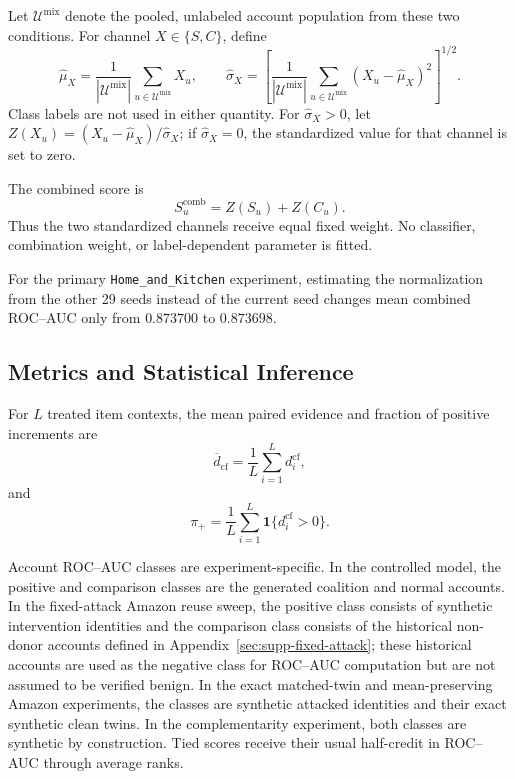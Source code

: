 Let $\mathcal U^{\mathrm{mix}}$ denote the pooled, unlabeled account population
from these two conditions. For channel $X\in\{S,C\}$, define
\[
\widehat\mu_X
=
\frac{1}{|\mathcal U^{\mathrm{mix}}|}
\sum_{u\in\mathcal U^{\mathrm{mix}}}X_u,
\qquad
\widehat\sigma_X
=
\left[
\frac{1}{|\mathcal U^{\mathrm{mix}}|}
\sum_{u\in\mathcal U^{\mathrm{mix}}}
(X_u-\widehat\mu_X)^2
\right]^{1/2}.
\]
Class labels are not used in either quantity. For $\widehat\sigma_X>0$, let
$Z(X_u)=(X_u-\widehat\mu_X)/\widehat\sigma_X$; if
$\widehat\sigma_X=0$, the standardized value for that channel is set to zero.

The combined score is
\begin{equation}
\label{eq:supp-combined-score}
S_u^{\mathrm{comb}}
=
Z(S_u)+Z(C_u).
\end{equation}
Thus the two standardized channels receive equal fixed weight. No classifier,
combination weight, or label-dependent parameter is fitted.

For the primary \texttt{Home\_and\_Kitchen} experiment, estimating the
normalization from the other 29 seeds instead of the current seed changes
mean combined ROC--AUC only from $0.873700$ to $0.873698$.



\subsection{Metrics and Statistical Inference}
\label{sec:supp-metrics}

For $L$ treated item contexts, the mean paired evidence and fraction of
positive increments are
\begin{equation}
\label{eq:supp-mean-dcf}
\overline d_{\mathrm{cf}}
=
\frac{1}{L}
\sum_{i=1}^{L}d_i^{\mathrm{cf}},
\end{equation}
and
\begin{equation}
\label{eq:supp-positive-dcf}
\pi_+
=
\frac{1}{L}
\sum_{i=1}^{L}
\mathbf 1\{d_i^{\mathrm{cf}}>0\}.
\end{equation}

Account ROC--AUC classes are experiment-specific. In the controlled model,
the positive and comparison classes are the generated coalition and normal
accounts. In the fixed-attack Amazon reuse sweep, the positive class consists
of synthetic intervention identities and the comparison class consists of
the historical non-donor accounts defined in
Appendix~\ref{sec:supp-fixed-attack}; these historical
accounts are used as the negative class for ROC--AUC computation but are not
assumed to be verified benign. In the exact matched-twin and mean-preserving
Amazon experiments, the classes are synthetic attacked identities and their
exact synthetic clean twins. In the complementarity experiment, both classes
are synthetic by construction. Tied scores receive their usual half-credit
in ROC--AUC through average ranks.

